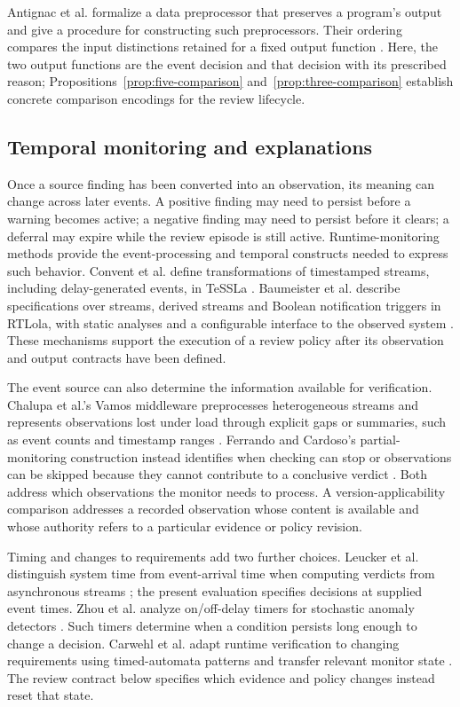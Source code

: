\documentclass[preprint,11pt]{elsarticle}
\begin{document}
Antignac et al. formalize a data preprocessor that preserves a program's output and give a procedure for constructing such preprocessors. Their ordering compares the input distinctions retained for a fixed output function \cite{antignac2017minimisation}. Here, the two output functions are the event decision and that decision with its prescribed reason; Propositions~\ref{prop:five-comparison} and~\ref{prop:three-comparison} establish concrete comparison encodings for the review lifecycle.

\subsection{Temporal monitoring and explanations}
Once a source finding has been converted into an observation, its meaning can change across later events. A positive finding may need to persist before a warning becomes active; a negative finding may need to persist before it clears; a deferral may expire while the review episode is still active. Runtime-monitoring methods provide the event-processing and temporal constructs needed to express such behavior. Convent et al. define transformations of timestamped streams, including delay-generated events, in TeSSLa \cite{convent2018tessla}. Baumeister et al. describe specifications over streams, derived streams and Boolean notification triggers in RTLola, with static analyses and a configurable interface to the observed system \cite{baumeister2026rtlola}. These mechanisms support the execution of a review policy after its observation and output contracts have been defined.

The event source can also determine the information available for verification. Chalupa et al.'s Vamos middleware preprocesses heterogeneous streams and represents observations lost under load through explicit gaps or summaries, such as event counts and timestamp ranges \cite{chalupa2025vamos}. Ferrando and Cardoso's partial-monitoring construction instead identifies when checking can stop or observations can be skipped because they cannot contribute to a conclusive verdict \cite{ferrando2025partial}. Both address which observations the monitor needs to process. A version-applicability comparison addresses a recorded observation whose content is available and whose authority refers to a particular evidence or policy revision.

Timing and changes to requirements add two further choices. Leucker et al. distinguish system time from event-arrival time when computing verdicts from asynchronous streams \cite{leucker2020streams}; the present evaluation specifies decisions at supplied event times. Zhou et al. analyze on/off-delay timers for stochastic anomaly detectors \cite{zhou2025delay}. Such timers determine when a condition persists long enough to change a decision. Carwehl et al. adapt runtime verification to changing requirements using timed-automata patterns and transfer relevant monitor state \cite{carwehl2023changing}. The review contract below specifies which evidence and policy changes instead reset that state.
\end{document}
